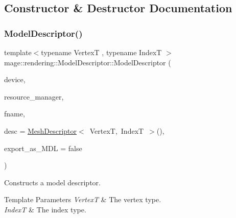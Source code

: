 \subsection{Constructor \& Destructor Documentation}
\mbox{\label{classmage_1_1rendering_1_1_model_descriptor_a69a6ffd3c69cec0ef7f395a5228158ea}} 
\subsubsection{\texorpdfstring{Model\+Descriptor()}{ModelDescriptor()}\hspace{0.1cm}{\footnotesize\ttfamily [1/3]}}
{\footnotesize\ttfamily template$<$typename VertexT , typename IndexT $>$ \\
mage\+::rendering\+::\+Model\+Descriptor\+::\+Model\+Descriptor (\begin{DoxyParamCaption}\item[{I\+D3\+D11\+Device \&}]{device,  }\item[{\mbox{\hyperlink{classmage_1_1rendering_1_1_resource_manager}{Resource\+Manager}} \&}]{resource\+\_\+manager,  }\item[{std\+::wstring}]{fname,  }\item[{const \mbox{\hyperlink{classmage_1_1rendering_1_1_mesh_descriptor}{Mesh\+Descriptor}}$<$ VertexT, IndexT $>$ \&}]{desc = {\ttfamily \mbox{\hyperlink{classmage_1_1rendering_1_1_mesh_descriptor}{Mesh\+Descriptor}}$<$~VertexT,~IndexT~$>$()},  }\item[{bool}]{export\+\_\+as\+\_\+\+M\+DL = {\ttfamily false} }\end{DoxyParamCaption})\hspace{0.3cm}{\ttfamily [explicit]}}

Constructs a model descriptor.


\begin{DoxyTemplParams}{Template Parameters}
{\em VertexT} & The vertex type. \\
\hline
{\em IndexT} & The index type. \\
\hline
\end{DoxyTemplParams}

